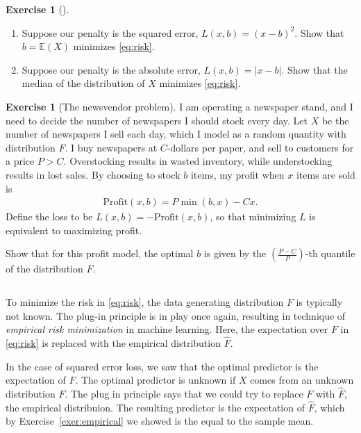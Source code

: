 \documentclass[11pt]{article}
\theoremstyle{definition}
\newtheorem{exercise}[]{Exercise}
\newcommand{\E}{\mathbb{E}}
\begin{document}
\begin{exercise}[]
  $\quad$\vspace{-1em}

  \begin{enumerate}[label = (\alph*)]
    \item Suppose our penalty is the squared error, $L(x, b) = (x - b)^2$. Show that $b = \E(X)$ minimizes
    \eqref{eq:risk}.
    \item Suppose our penalty is the absolute error, $L(x, b) = |x - b|$. Show that the median of the
    distribution of $X$ minimizes \eqref{eq:risk}.
  \end{enumerate}
\end{exercise}


\begin{exercise}[The newsvendor problem]
  I am operating a newspaper stand, and I need to decide the number of newspapers
  I should stock every day.
  Let $X$ be the number of newspapers I sell each day, which I model as
  a random quantity with
  distribution $F$.
  I buy newspapers at $C$-dollars per paper, and sell to customers for a price $P > C$.
  Overstocking results in wasted inventory, while understocking results in lost sales.
  By choosing to stock $b$ items, my profit when $x$ items
  are sold is
  \begin{align}
    \textrm{Profit}(x, b) = P\min(b, x) - Cx.
  \end{align}
  Define the loss to be $L(x, b) = - \textrm{Profit}(x, b)$, so that
  minimizing $L$ is equivalent to maximizing profit.

  Show that for this profit model, the optimal $b$ is given by the $(\frac{P - C}{P})$-th
  quantile of the distribution $F$.

\end{exercise}

$\quad$

To minimize the risk in \eqref{eq:risk}, the data generating distribution
$F$ is typically not known.
The plug-in principle is in play once again, resulting in technique of
\textit{empirical risk minimization} in machine learning.
Here, the expectation over $F$ in \eqref{eq:risk} is replaced with the empirical
distribution $\hat F$.

In the case of squared error loss, we saw that the optimal predictor is the
expectation of $F$.
The optimal predictor is unknown if $X$ comes from an unknown distribution $F$.
The plug in principle says that we could try to replace $F$ with $\hat F$,
the empirical distribuion.
The resulting predictor is the expectation of $\hat F$, which by
Exercise~\ref{exer:empirical} we showed is the equal to the sample mean.
\end{document}
